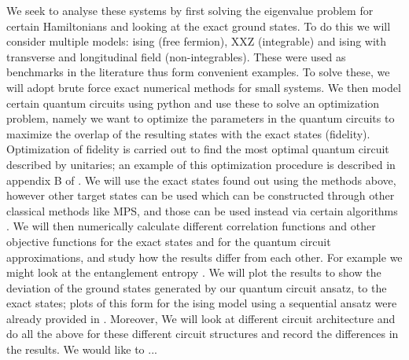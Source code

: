 \documentclass{physics_article}
\begin{document}
	We seek to analyse these systems by first solving the eigenvalue problem for certain Hamiltonians and looking at the exact ground states. To do this we will consider multiple models: ising (free fermion), XXZ (integrable) and ising with transverse and longitudinal field (non-integrables). These were used as benchmarks in the literature \cite{PhysRevResearch.4.L022020,PRXQuantum.2.010342,PhysRevResearch.4.033118} thus form convenient examples. To solve these, we will adopt brute force exact numerical methods for small systems. We then model certain quantum circuits using python and use these to solve an optimization problem, namely we want to optimize the parameters in the quantum circuits to maximize the overlap of the resulting states with the exact states (fidelity). Optimization of fidelity is carried out to find the most optimal quantum circuit described by unitaries; an example of this optimization procedure is described in appendix B of \cite{PRXQuantum.2.010342}. We will use the exact states found out using the methods above, however other target states can be used which can be constructed through other classical methods like MPS, and those can be used instead via certain algorithms \cite{PRXQuantum.2.010342}. We will then numerically calculate different correlation functions and other objective functions for the exact states and for the quantum circuit approximations, and study how the results differ from each other. For example we might look at the entanglement entropy \cite{PhysRevResearch.4.033118}. We will plot the results to show the deviation of the ground states generated by our quantum circuit ansatz, to the exact states; plots of this form for the ising model using a sequential ansatz were already provided in \cite{PRXQuantum.2.010342}. Moreover, We will look at different circuit architecture and do all the above for these different circuit structures and record the differences in the results. We would like to ...


 	
 	
\end{document}
